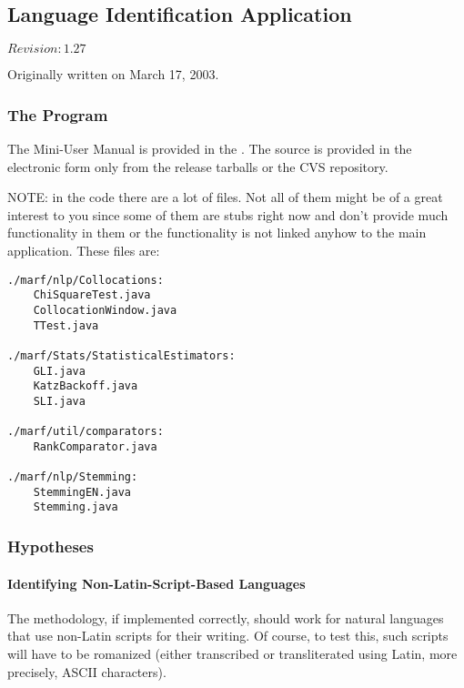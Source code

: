 \subsection{Language Identification Application}

$Revision: 1.27 $

Originally written on March 17, 2003.

\subsubsection{The Program}

The Mini-User Manual is provided in the . The source
is provided in the electronic form only from the release tarballs or the CVS repository.

NOTE: in the code there are a lot of files. Not all of them might
be of a great interest to you since
some of them are stubs right now and don't provide much functionality in them
or the functionality is not linked anyhow to the main application.
These files are:

\begin{verbatim}
./marf/nlp/Collocations:
    ChiSquareTest.java
    CollocationWindow.java
    TTest.java

./marf/Stats/StatisticalEstimators:
    GLI.java
    KatzBackoff.java
    SLI.java

./marf/util/comparators:
    RankComparator.java

./marf/nlp/Stemming:
    StemmingEN.java
    Stemming.java
\end{verbatim}


\subsubsection{Hypotheses}

\paragraph{Identifying Non-Latin-Script-Based Languages}

The methodology, if implemented correctly, should work
for natural languages that use non-Latin scripts for
their writing. Of course, to test this, such scripts
will have to be romanized (either transcribed or transliterated
using Latin, more precisely, ASCII characters).

